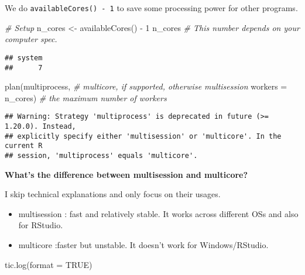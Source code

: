 \documentclass[
]{book}
\newenvironment{Shaded}{\begin{snugshade}}{\end{snugshade}}
\newcommand{\AttributeTok}[1]{\textcolor[rgb]{0.77,0.63,0.00}{#1}}
\newcommand{\CommentTok}[1]{\textcolor[rgb]{0.56,0.35,0.01}{\textit{#1}}}
\newcommand{\ConstantTok}[1]{\textcolor[rgb]{0.00,0.00,0.00}{#1}}
\newcommand{\DecValTok}[1]{\textcolor[rgb]{0.00,0.00,0.81}{#1}}
\newcommand{\FunctionTok}[1]{\textcolor[rgb]{0.00,0.00,0.00}{#1}}
\newcommand{\NormalTok}[1]{#1}
\newcommand{\OtherTok}[1]{\textcolor[rgb]{0.56,0.35,0.01}{#1}}
\newcommand{\SpecialCharTok}[1]{\textcolor[rgb]{0.00,0.00,0.00}{#1}}
\providecommand{\tightlist}{%
  \setlength{\itemsep}{0pt}\setlength{\parskip}{0pt}}
\begin{document}
We do \texttt{availableCores()\ -\ 1} to save some processing power for other programs.

\begin{Shaded}
\begin{Highlighting}[]
\CommentTok{\# Setup }
\NormalTok{n\_cores }\OtherTok{\textless{}{-}} \FunctionTok{availableCores}\NormalTok{() }\SpecialCharTok{{-}} \DecValTok{1}
\NormalTok{n\_cores }\CommentTok{\# This number depends on your computer spec.}
\end{Highlighting}
\end{Shaded}

\begin{verbatim}
## system 
##      7
\end{verbatim}

\begin{Shaded}
\begin{Highlighting}[]
\FunctionTok{plan}\NormalTok{(multiprocess, }\CommentTok{\# multicore, if supported, otherwise multisession}
     \AttributeTok{workers =}\NormalTok{ n\_cores) }\CommentTok{\# the maximum number of workers}
\end{Highlighting}
\end{Shaded}

\begin{verbatim}
## Warning: Strategy 'multiprocess' is deprecated in future (>= 1.20.0). Instead,
## explicitly specify either 'multisession' or 'multicore'. In the current R
## session, 'multiprocess' equals 'multicore'.
\end{verbatim}

\textbf{What's the difference between multisession and multicore?}

I skip technical explanations and only focus on their usages.

\begin{itemize}
\tightlist
\item
  multisession : fast and relatively stable. It works across different OSs and also for RStudio.
\item
  multicore :faster but unstable. It doesn't work for Windows/RStudio.
\end{itemize}

\begin{Shaded}
\begin{Highlighting}[]
\FunctionTok{tic.log}\NormalTok{(}\AttributeTok{format =} \ConstantTok{TRUE}\NormalTok{)}
\end{Highlighting}
\end{Shaded}
\end{document}
